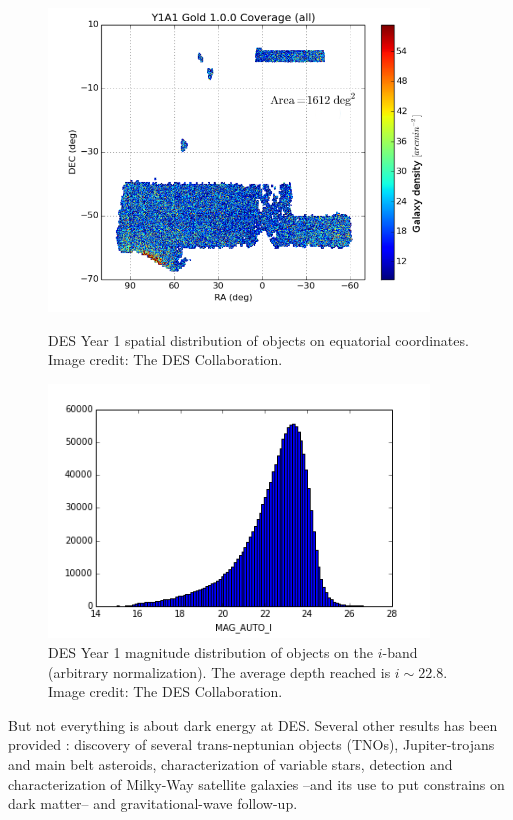 \begin{figure}
\begin{center}
\includegraphics[width=0.9\textwidth]{./Pictures/des_y1_coverage.png}
\caption{DES Year 1 spatial distribution of objects on equatorial coordinates. Image credit: The DES Collaboration.}
\label{fig:des_y1_coverage}

\includegraphics[width=0.9\textwidth]{./Pictures/des_y1_mag_auto_i.png}
\caption{DES Year 1 magnitude distribution of objects on the $i$-band (arbitrary normalization). The average depth reached is $i\sim 22.8$. Image credit: The DES Collaboration.}
\label{fig:des_y1_mag_auto_i}
\end{center}
\end{figure}
\newline

But not everything is about dark energy at DES. Several other results has been provided \cite{2016MNRAS.460.1270D}: discovery of several trans-neptunian objects (TNOs), Jupiter-trojans and main belt asteroids, characterization of variable stars, detection and characterization of Milky-Way satellite galaxies --and its use to put constrains on dark matter-- and gravitational-wave follow-up.

